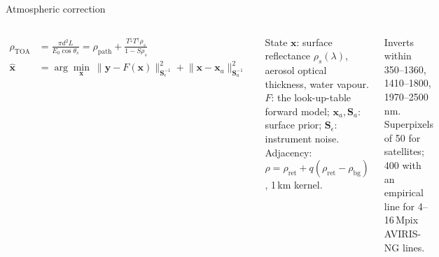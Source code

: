 \documentclass[aspectratio=169,10pt]{beamer}
\newcommand{\tx}[1]{{\fontsize{6.6}{7.9}\selectfont #1\par}}
\begin{document}
\begin{frame}{Atmospheric correction}
\centering

\vspace{0.4mm}
\begin{columns}[T,onlytextwidth]
\par\vspace{-1.6mm}
{\fontsize{7.2}{8.8}\selectfont\begin{align*}
\rho_{\mathrm{TOA}}&=\frac{\pi d^2 L}{E_0\cos\theta_s}=\rho_{\mathrm{path}}+\frac{T^{\downarrow}T^{\uparrow}\rho_s}{1-S\rho_s}\\
\hat{\mathbf x}&=\arg\min_{\mathbf x}\ \big\|\mathbf y-F(\mathbf x)\big\|^2_{\mathbf S_\epsilon^{-1}}+\big\|\mathbf x-\mathbf x_a\big\|^2_{\mathbf S_a^{-1}}
\end{align*}\par}
\vspace{-1.8mm}
\tx{State $\mathbf x$: surface reflectance $\rho_s(\lambda)$, aerosol optical thickness, water vapour. $F$: the look-up-table forward model; $\mathbf x_a,\mathbf S_a$: surface prior; $\mathbf S_\epsilon$: instrument noise. Adjacency: $\rho=\rho_{\mathrm{ret}}+q(\rho_{\mathrm{ret}}-\rho_{\mathrm{bg}})$, 1\,km kernel.}
\vspace{0.6mm}
\tx{Inverts within 350--1360, 1410--1800, 1970--2500\,nm. Superpixels of 50 for satellites; 400 with an empirical line for 4--16\,Mpix AVIRIS-NG lines.}
\par\vspace{0.2mm}
\end{columns}
\end{frame}
\end{document}
